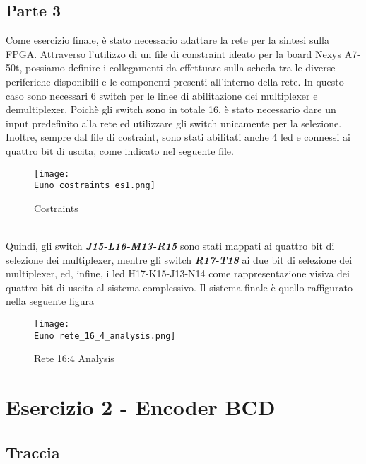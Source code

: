 \documentclass[12pt]{article}
\def \Euno {Allegati/Esercizio1/}
\begin{document}
\subsection{Parte 3}
Come esercizio finale, è stato necessario adattare la rete per la sintesi sulla FPGA. Attraverso l’utilizzo di un file di constraint ideato per la board Nexys A7-50t, possiamo definire i collegamenti da effettuare sulla scheda tra le diverse periferiche disponibili e le componenti presenti all’interno della rete.
\newline
In questo caso sono necessari 6 switch per le linee di abilitazione dei multiplexer e demultiplexer. Poichè gli switch sono in totale 16, è stato necessario dare un input predefinito alla rete ed utilizzare gli switch unicamente per la selezione.
Inoltre, sempre dal file di costraint, sono stati abilitati anche 4 led e connessi ai quattro bit di uscita, come indicato nel seguente file.
\begin{figure}[ht]
    \centering
    \texttt{[image: \\Euno costraints\_es1.png]}
    \caption{Costraints}
\end{figure}
\\Quindi, gli switch \textbf{\textit{J15-L16-M13-R15}} sono stati mappati ai quattro bit di selezione dei multiplexer, mentre gli switch \textbf{\textit{R17-T18}} ai due bit di selezione dei multiplexer, ed, infine, i led H17-K15-J13-N14 come rappresentazione visiva dei quattro bit di uscita al sistema complessivo.
\newline
Il sistema finale è quello raffigurato nella seguente figura
\begin{figure}[ht]
    \centering
    \texttt{[image: \\Euno rete\_16\_4\_analysis.png]}
    \caption{Rete 16:4 Analysis}
\end{figure}


\newpage
\section{Esercizio 2 - Encoder BCD}
\subsection{Traccia}
\end{document}
